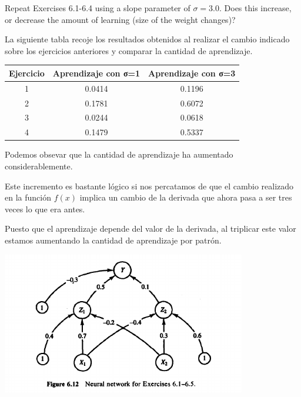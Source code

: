 \begin{problem}[5]
Repeat Exercises 6.1-6.4 using a slope parameter of $σ = 3.0$. Does this increase, or decrease the amount of learning (size of the weight changes)?

\solution

La siguiente tabla recoje los resultados obtenidos al realizar el cambio indicado sobre los ejercicios anteriores y comparar la cantidad de aprendizaje.

\begin{center}
\begin{tabular}{|c|c|c|}
\hline
\textbf{Ejercicio} & \textbf{Aprendizaje con σ=1} & \textbf{Aprendizaje con σ=3} \\
\hline
1 & 0.0414 & 0.1196\\
2 & 0.1781 & 0.6072\\
3 & 0.0244 & 0.0618\\
4 & 0.1479 & 0.5337\\
\hline
\end{tabular}
\end{center}

Podemos obsevar que la cantidad de aprendizaje ha aumentado considerablemente.

Este incremento es bastante lógico si nos percatamos de que el cambio realizado en la función $f(x)$ implica un cambio de la derivada que ahora pasa a ser tres veces lo que era antes.

Puesto que el aprendizaje depende del valor de la derivada, al triplicar este valor estamos aumentando la cantidad de aprendizaje por patrón.
\end{problem}

\begin{center}
\includegraphics[width=0.8\textwidth]{img/figure6-12.png}
\end{center}

